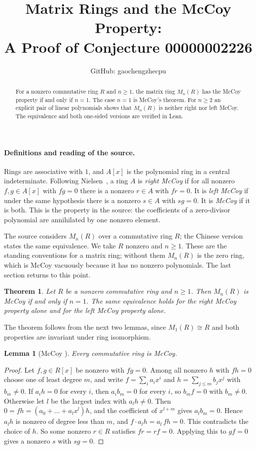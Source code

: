 \documentclass[11pt]{article}
\title{Matrix Rings and the McCoy Property:\\A Proof of Conjecture 00000002226}
\author{GitHub: gaochengzhecpu}
\date{}
\newtheorem{theorem}{Theorem}
\newtheorem{lemma}{Lemma}
\begin{document}
\maketitle
\begin{abstract}
For a nonzero commutative ring $R$ and $n\ge1$, the matrix ring $M_n(R)$
has the McCoy property if and only if $n=1$. The case $n=1$ is McCoy's
theorem. For $n\ge2$ an explicit pair of linear polynomials shows that
$M_n(R)$ is neither right nor left McCoy. The equivalence and both
one-sided versions are verified in Lean.
\end{abstract}

\paragraph{Definitions and reading of the source.}
Rings are associative with $1$, and $A[x]$ is the polynomial ring in a
central indeterminate. Following Nielsen~\cite{nielsen}, a ring $A$ is
\emph{right McCoy} if for all nonzero $f,g\in A[x]$ with $fg=0$ there is
a nonzero $r\in A$ with $fr=0$. It is \emph{left McCoy} if under the
same hypothesis there is a nonzero $s\in A$ with $sg=0$. It is
\emph{McCoy} if it is both. This is the property in the source: the
coefficients of a zero-divisor polynomial are annihilated by one nonzero
element.

The source considers $M_n(R)$ over a commutative ring $R$; the Chinese
version states the same equivalence. We take $R$ nonzero and $n\ge1$. These are the standing conventions for a matrix
ring; without them $M_n(R)$ is the zero ring, which is McCoy vacuously
because it has no nonzero polynomials. The last section returns to this
point.

\begin{theorem}
Let $R$ be a nonzero commutative ring and $n\ge1$. Then $M_n(R)$ is
McCoy if and only if $n=1$. The same equivalence holds for the right
McCoy property alone and for the left McCoy property alone.
\end{theorem}

The theorem follows from the next two lemmas, since $M_1(R)\cong R$ and
both properties are invariant under ring isomorphism.

\begin{lemma}[McCoy \cite{mccoy}]
Every commutative ring is McCoy.
\end{lemma}
\begin{proof}
Let $f,g\in R[x]$ be nonzero with $fg=0$. Among all nonzero $h$ with
$fh=0$ choose one of least degree $m$, and write $f=\sum_i a_ix^i$ and
$h=\sum_{j\le m}b_jx^j$ with $b_m\ne0$. If $a_ih=0$ for every $i$, then
$a_ib_m=0$ for every $i$, so $b_mf=0$ with $b_m\ne0$. Otherwise let $l$
be the largest index with $a_lh\ne0$. Then
$0=fh=(a_0+\dots+a_lx^l)h$, and the coefficient of $x^{l+m}$ gives
$a_lb_m=0$. Hence $a_lh$ is nonzero of degree less than $m$, and
$f\cdot a_lh=a_l\,fh=0$. This contradicts the choice of $h$. So some
nonzero $r\in R$ satisfies $fr=rf=0$. Applying this to $gf=0$ gives a
nonzero $s$ with $sg=0$.
\end{proof}
\end{document}
